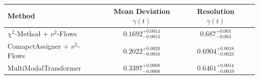     \begin{tabular}{lccc}
        \toprule
        Method & Mean Deviation $\gamma(t)$ & Resolution $\gamma(t)$ \\
        \midrule
        $\chi^2$-Method + $\nu^2$-Flows & $0.1692^{+0.0014}_{-0.0013}$ & $0.687^{+0.003}_{-0.003}$ \\
        ComapctAssigner + $\nu^2$-Flows & $0.2022^{+0.0020}_{-0.0016}$ & $0.6904^{+0.0018}_{-0.0023}$ \\
        MultiModalTransformer & $0.3397^{+0.0008}_{-0.0008}$ & $0.6461^{+0.0014}_{-0.0019}$ \\
        \bottomrule
    \end{tabular}